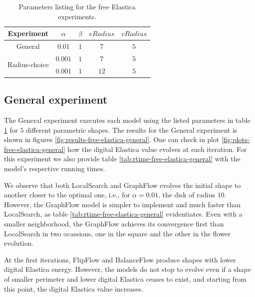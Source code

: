 \begin{table}
\centering
\begin{tabular}{|c|c|c|c|c|}
\hline
Experiment & $\alpha$ & $\beta$ & $eRadius$ & $vRadius$ \\
\hline
General & $0.01$ & $1$ & $7$ & $5$ \\
\hline
\multirow{2}{*}{Radius-choice} & $0.001$ & $1$ & $7$ & $5$\\
& $0.001$ & $1$ & $12$ & $5$\\
\hline
\end{tabular}
\caption{Parameters listing for the free Elastica experiments.}
\label{tab:free-elastica-parameters-summary}
\end{table}

\subsection{General experiment}

  The General experiment executes each model using the listed parameters in table \ref{tab:free-elastica-parameters-summary} for $5$ different parametric shapes. The results for the General experiment is shown in figures \ref{fig:results-free-elastica-general}. One can check in plot \ref{fig:plots-free-elastica-general} how the digital Elastica value evolves at each iteration. For this experiment we also provide table \ref{tab:rtime-free-elastica-general} with the model's respective running times.
  

We observe that both LocalSearch and GraphFlow evolves the initial shape to another closer to the optimal one, i.e., for $\alpha=0.01$, the disk of radius $10$. However, the GraphFlow model is simpler to implement and much faster than LocalSearch, as table \ref{tab:rtime-free-elastica-general} evidentiates. Even with a smaller neighborhood, the GraphFlow achieves its convergence first than LocalSearch in two ocassions, one in the square and the other in the flower evolution.

At the first iterations, FlipFlow and BalanceFlow produce shapes with lower digital Elastica energy. However, the models do not stop to evolve even if a shape of smaller perimeter and lower digital Elastica ceases to exist, and starting from this point, the digital Elastica value increases.


